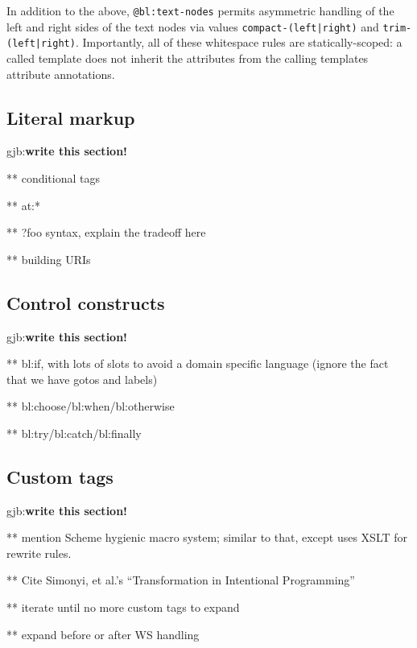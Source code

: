 \documentclass{www2003-submission}
\newcommand{\smtexttt}[1]{{\small\texttt{#1}}}
\newcommand{\gjb}[1]{{\sc gjb:}\textbf{#1}}
\begin{document}
In addition to the above, \smtexttt{@bl:text-nodes} permits asymmetric
handling of the left and right sides of the text nodes via values
\smtexttt{compact-(left|right)} and \smtexttt{trim-(left|right)}. 
Importantly, all of these whitespace rules are statically-scoped:
a called template does not inherit the attributes from the calling
templates attribute annotations.

\subsection{Literal markup}
\label{ssec-literal-markup}

\gjb{write this section!}

** conditional tags

** at:*

** ?foo syntax, explain the tradeoff here

** building URIs

\subsection{Control constructs}
\label{ssec-control}

\gjb{write this section!}

** bl:if, with lots of slots to avoid a domain specific language
(ignore the fact that we have gotos and labels)

** bl:choose/bl:when/bl:otherwise

** bl:try/bl:catch/bl:finally

\subsection{Custom tags}
\label{ssec-custom-tags}

\gjb{write this section!}

** mention Scheme hygienic macro system; similar to that, except uses
XSLT for rewrite rules.

** Cite Simonyi, et al.'s ``Transformation in Intentional Programming''

** iterate until no more custom tags to expand

** expand before or after WS handling
\end{document}
